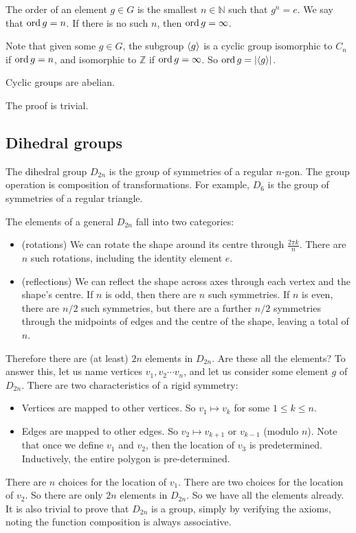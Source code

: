 \begin{definition}
	The order of an element \(g\in G\) is the smallest \(n \in \mathbb N\) such that \(g^n = e\).
	We say that \(\operatorname{ord} g = n\).
	If there is no such \(n\), then \(\operatorname{ord} g = \infty\).
\end{definition}
Note that given some \(g \in G\), the subgroup \(\langle{} g \rangle\) is a cyclic group isomorphic to \(C_n\) if \(\operatorname{ord} g = n\), and isomorphic to \(\mathbb Z\) if \(\operatorname{ord} g = \infty\).
So \(\operatorname{ord} g = \abs{\langle{} g \rangle}\).
\begin{proposition}
	Cyclic groups are abelian.
\end{proposition}
The proof is trivial.

\subsection{Dihedral groups}
\begin{definition}
	The dihedral group \(D_{2n}\) is the group of symmetries of a regular \(n\)-gon.
	The group operation is composition of transformations.
	For example, \(D_6\) is the group of symmetries of a regular triangle.
\end{definition}
The elements of a general \(D_{2n}\) fall into two categories:
\begin{itemize}
	\item (rotations) We can rotate the shape around its centre through \(\frac{2\pi k}{n}\).
	      There are \(n\) such rotations, including the identity element \(e\).
	\item (reflections) We can reflect the shape across axes through each vertex and the shape's centre.
	      If \(n\) is odd, then there are \(n\) such symmetries.
	      If \(n\) is even, there are \(n/2\) such symmetries, but there are a further \(n/2\) symmetries through the midpoints of edges and the centre of the shape, leaving a total of \(n\).
\end{itemize}
Therefore there are (at least) \(2n\) elements in \(D_{2n}\).
Are these all the elements?
To answer this, let us name vertices \(v_1, v_2 \cdots v_n\), and let us consider some element \(g\) of \(D_{2n}\).
There are two characteristics of a rigid symmetry:
\begin{itemize}
	\item Vertices are mapped to other vertices.
	      So \(v_1 \mapsto v_k\) for some \(1 \leq k \leq n\).
	\item Edges are mapped to other edges.
	      So \(v_2 \mapsto v_{k+1}\) or \(v_{k-1}\) (modulo \(n\)).
	      Note that once we define \(v_1\) and \(v_2\), then the location of \(v_3\) is predetermined.
	      Inductively, the entire polygon is pre-determined.
\end{itemize}
There are \(n\) choices for the location of \(v_1\).
There are two choices for the location of \(v_2\).
So there are only \(2n\) elements in \(D_{2n}\).
So we have all the elements already.
It is also trivial to prove that \(D_{2n}\) is a group, simply by verifying the axioms, noting the function composition is always associative.

